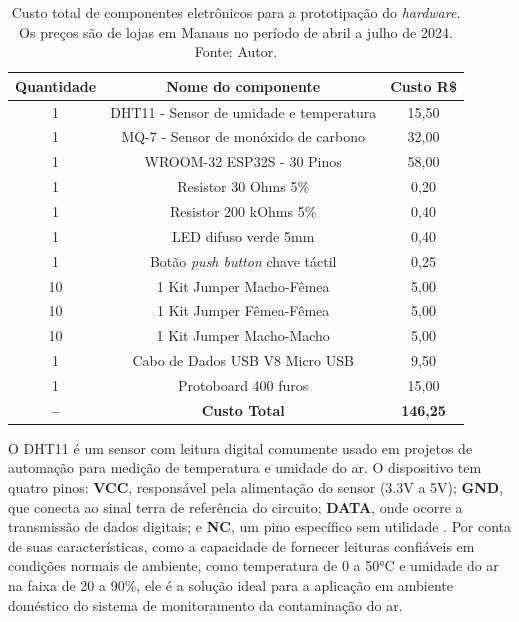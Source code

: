 \begin{table}[h!]
    \centering
    \caption{Custo total de componentes eletrônicos para a prototipação do \textit{hardware}. Os preços são de lojas em Manaus no período de abril a julho de 2024. Fonte: Autor.}\label{tabPrecoHardware}
    \begin{tabular}{c|c|c}
        \hline
        \textbf{Quantidade} & \textbf{Nome do componente} & \textbf{Custo R\$} \\
        \hline
        1 & DHT11 - Sensor de umidade e temperatura & 15,50 \\
        \hline
        1 & MQ-7 - Sensor de monóxido de carbono & 32,00 \\
        \hline
        1 & WROOM-32 ESP32S - 30 Pinos & 58,00 \\
        \hline
        1 & Resistor 30 Ohms 5\% & 0,20 \\
        \hline
        1 & Resistor 200 kOhms 5\% & 0,40 \\
        \hline
        1 & LED difuso verde 5mm & 0,40 \\
        \hline
        1 & Botão \textit{push button} chave táctil & 0,25 \\
        \hline
        10 & 1 Kit Jumper Macho-Fêmea & 5,00 \\
        \hline
        10 & 1 Kit Jumper Fêmea-Fêmea & 5,00 \\
        \hline
        10 & 1 Kit Jumper Macho-Macho & 5,00 \\
        \hline
        1 & Cabo de Dados USB V8 Micro USB & 9,50 \\
        \hline
        1 & Protoboard 400 furos & 15,00 \\
        \hline
        \textbf{--} & \textbf{Custo Total} & \textbf{146,25} \\
        \hline
    \end{tabular}
\end{table}

O DHT11 é um sensor com leitura digital comumente usado em projetos de automação para medição de temperatura e umidade do ar. O dispositivo 
tem quatro pinos: \textbf{VCC}, responsável pela alimentação do sensor (3.3V a 5V); \textbf{GND}, que conecta ao sinal terra de referência do circuito; \textbf{DATA}, onde ocorre a transmissão 
de dados digitais; e \textbf{NC}, um pino específico sem utilidade \cite{dht11-documentation}. Por conta de suas características, como a capacidade de fornecer leituras confiáveis em condições normais de ambiente, como 
temperatura de 0 a 50°C e umidade do ar na faixa de 20 a 90\%, ele é a solução ideal para a aplicação em ambiente doméstico do sistema de monitoramento da contaminação do ar.

